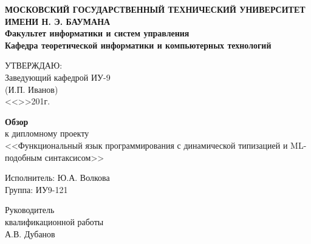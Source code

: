 
\thispagestyle{empty}
\newpage
{
\centering


\textbf{
МОСКОВСКИЙ ГОСУДАРСТВЕННЫЙ ТЕХНИЧЕСКИЙ УНИВЕРСИТЕТ ИМЕНИ Н. Э. БАУМАНА \\
Факультет информатики и систем управления \\
Кафедра теоретической информатики и компьютерных технологий}

\vfill

\hfill\parbox{7cm} {
УТВЕРЖДАЮ:\\
Заведующий кафедрой ИУ-9 \hfill \\
\underline{\hspace{4cm}}(И.П. Иванов)\hfill \\
<<\underline{\hspace{0.5cm}}>>\underline{\hspace{3cm}}201\underline{\hspace{0.5cm}}г.\hfill \\
}

\bigskip
\bigskip
\bigskip
\bigskip
\bigskip
\bigskip
\bigskip
\bigskip

\vfill

{\large\bf Обзор} \\
к дипломному проекту \\
<<Функциональный язык программирования с динамической типизацией и ML-подобным синтаксисом>>

\vfill

\hfill\parbox{7cm} {
Исполнитель: Ю.А. Волкова \\
Группа: ИУ9-121
}

\bigskip
\bigskip
\bigskip
\bigskip
\bigskip
\bigskip
\bigskip

\vfill

Руководитель \\
квалификационной работы \\
А.В. Дубанов

\vspace{\fill}
}

\clearpage
